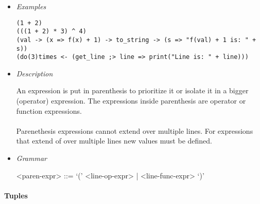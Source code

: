 \documentclass{article}
\begin{document}
\begin{itemize}

\item \textit{Examples}
\begin{verbatim}
(1 + 2)
(((1 + 2) * 3) ^ 4)
(val -> (x => f(x) + 1) -> to_string -> (s => "f(val) + 1 is: " + s))
(do(3)times <- (get_line ;> line => print("Line is: " + line)))
\end{verbatim}

\item \textit{Description}

An expression is put in parenthesis to prioritize it or isolate it in a bigger
(operator) expression. The expressions inside parenthesis are operator
or function expressions.
\\\\
Parenethesis expressions cannot extend over multiple lines. For expressions
that extend of over multiple lines new values must be defined.

\item \textit{Grammar}
\begin{grammar}
<paren-expr> ::= `(' <line-op-expr> | <line-func-expr> `)'  
\end{grammar}

\end{itemize}

\paragraph{Tuples}
\end{document}
